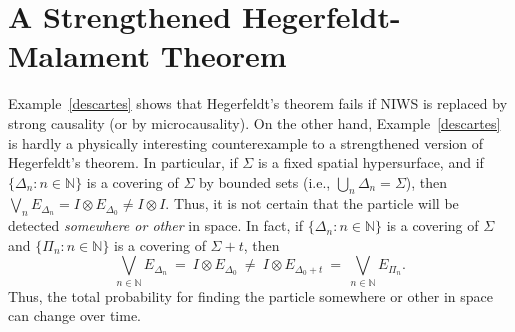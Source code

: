 \documentclass[12pt]{article}
\theoremstyle{remark}
\begin{document}
\section{A Strengthened Hegerfeldt-Malament Theorem} \label{main}
Example~\ref{descartes} shows that Hegerfeldt's theorem fails if NIWS
is replaced by strong causality (or by microcausality).  On the other
hand, Example~\ref{descartes} is hardly a physically interesting
counterexample to a strengthened version of Hegerfeldt's theorem.  In
particular, if $\Sigma$ is a fixed spatial hypersurface, and if $\{
\Delta _{n}:n\in \mathbb{N} \}$ is a covering of $\Sigma$ by bounded
sets (i.e., $\bigcup _{n}\Delta _{n}=\Sigma$), then $\bigvee
_{n}E_{\Delta _{n}}=I\otimes E_{\Delta _{0}}\neq I\otimes I$.  Thus,
it is not certain that the particle will be detected \emph{somewhere
  or other} in space.  In fact, if $\{ \Delta _{n}:n\in \mathbb{N}\}$
is a covering of $\Sigma$ and $\{ \Pi _{n}:n\in \mathbb{N}\}$ is a
covering of $\Sigma +t$, then \begin{equation} \bigvee _{n\in
    \mathbb{N}}E_{\Delta_{n}}\:=\:I\otimes E_{\Delta _{0}}\:\neq \:
  I\otimes E_{\Delta _{0}+t}\:=\:\bigvee _{n\in \mathbb{N}}E_{\Pi
    _{n}} .\end{equation} Thus, the total probability for finding the
particle somewhere or other in space can change over time.
\end{document}
